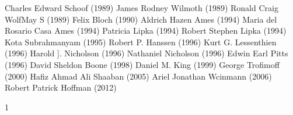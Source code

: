 \documentclass{report}
\begin{document}
\begin{refsegment}
\begin{multicols}{2}
Charles Edward Schoof (1989)\newline
James Rodney Wilmoth (1989)\newline
Ronald Craig WolfMay S (1989)\newline
Felix Bloch (1990)\newline
Aldrich Hazen Ames (1994)\newline
Maria del Rosario Casa Ames (1994)\newline
Patricia Lipka (1994)\newline
Robert Stephen Lipka (1994)\newline
Kota Subrahmanyam (1995)\newline
Robert P. Hanssen (1996)\newline
Kurt G. Lessenthien (1996)\newline
Harold ]. Nicholson (1996)\newline
Nathaniel Nicholson (1996)\newline
Edwin Earl Pitts (1996)\newline
David Sheldon Boone (1998)\newline
Daniel M. King (1999)\newline
George Trofimoff (2000)\newline
Hafiz Ahmad Ali Shaaban (2005)\newline
Ariel Jonathan Wcinmann (2006)\newline
Robert Patrick Hoffman (2012)
\end{multicols}


\newpage
\printbibliography[heading=subbibliography]

\end{refsegment}
1
\end{document}
